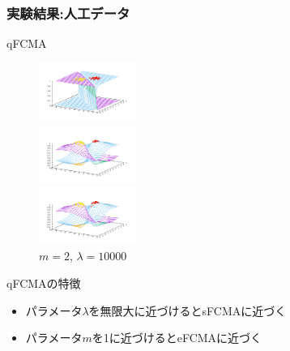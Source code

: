 \documentclass[13pt,dvipdfmx]{beamer}
\begin{document}
\begin{frame}\frametitle{実験結果:人工データ}
  \begin{block}{qFCMA}
    \begin{figure}[htbp]
      \begin{minipage}{0.32\hsize}
        \begin{center}
          \includegraphics[width=32mm]{qFCMA-Em11-Lambda10.png}
        \end{center}
        \captionsetup{labelformat=empty,labelsep=none}
        \caption{$m=1.01$\;, \;$\lambda=10$}
        \label{fig:one}
      \end{minipage}
      \begin{minipage}{0.32\hsize}
        \begin{center}
          \includegraphics[width=32mm]{qFCMA-Em2-Lambda10.png}
        \end{center}
        \captionsetup{labelformat=empty,labelsep=none}
        \caption{$m=2$\;, \;$\lambda=10$}
        \label{fig:two}
      \end{minipage}
      \begin{minipage}{0.32\hsize}
        \begin{center}
          \includegraphics[width=32mm]{qFCMA-Em2-Lambda10000.png}
        \end{center}
        \captionsetup{labelformat=empty,labelsep=none}
        \caption{$m=2$\;, \;$\lambda=10000$}
        \label{fig:three}
      \end{minipage}
    \end{figure}
  \end{block}
  \begin{block}{qFCMAの特徴}
    \begin{itemize}
      \item パラメータ$\lambda$を無限大に近づけるとsFCMAに近づく
      \item パラメータ$m$を1に近づけるとeFCMAに近づく    
    \end{itemize}
  \end{block}
\end{frame}
\end{document}
